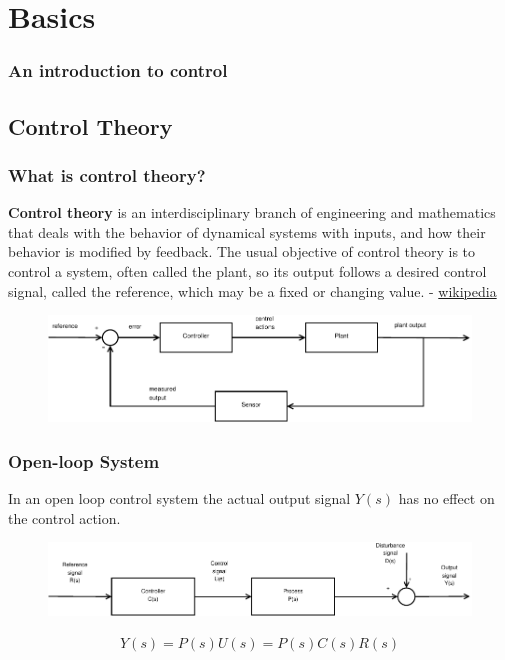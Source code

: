 \section{Basics}
\begin{frame}
\frametitle{An introduction to control}
\end{frame}

\subsection[Control Theory]{Control Theory}
\begin{frame}
\frametitle{What is control theory?}
\begin{block}{}
	\textbf{Control theory} is an interdisciplinary branch of engineering and mathematics that deals with the behavior of dynamical systems with inputs, and how their behavior is modified by feedback. The usual objective of control theory is to control a system, often called the plant, so its output follows a desired control signal, called the reference, which may be a fixed or changing value. - \href{https://en.wikipedia.org/wiki/Control_theory}{wikipedia} 
\end{block}
\vspace{2em}
\begin{figure}
	\centering
	\includegraphics[width=0.7\linewidth]{controlsystem}
	\label{fig:controlsystem}
\end{figure}

\end{frame}

\begin{frame}
	\frametitle{Open-loop System}
	\begin{definition}
		In an open loop control system the actual output signal $Y(s)$ has no effect on the control action.
		\vspace{-1em}
		\begin{figure}
			\centering
			\includegraphics[width=0.8\linewidth]{Open-Loop}
			\label{fig:Open-Loop}
		\end{figure}
		\begin{align*}
		Y(s) = P(s)U(s) = P(s)C(s)R(s) \\
		\end{align*}
	\end{definition}
\end{frame}

